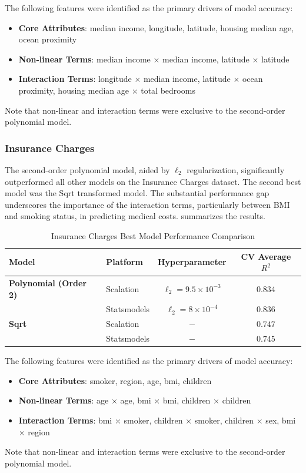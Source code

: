 \documentclass{article}
\begin{document}
The following features were identified as the primary drivers of model accuracy:
\begin{itemize}
	\item \textbf{Core Attributes}: median income, longitude, latitude, housing median age, ocean proximity
	\item \textbf{Non-linear Terms}: median income $\times$ median income, latitude $\times$ latitude
	\item \textbf{Interaction Terms}: longitude $\times$ median income, latitude $\times$ ocean proximity, housing median age $\times$ total bedrooms
\end{itemize}
Note that non-linear and interaction terms were exclusive to the second-order polynomial model.

\subsubsection{Insurance Charges}

The second-order polynomial model, aided by $\ell_2$ regularization, significantly outperformed all other models on the Insurance Charges dataset. The second best model was the Sqrt transformed model. The substantial performance gap underscores the importance of the interaction terms, particularly between BMI and smoking status, in predicting medical costs.  summarizes the results.

\begin{table}[H]
\centering
\caption{Insurance Charges Best Model Performance Comparison}
\label{tab:Insurance Charges Best Model Performance Comparison}
\begin{tabular}{@{}llcc@{}}
\toprule
\textbf{Model} & \textbf{Platform} & \textbf{Hyperparameter} & \textbf{CV Average $R^2$} \\ \midrule
\textbf{Polynomial (Order 2)} & Scalation   & $\ell_2 = 9.5\times10^{-3}$ & $0.834$ \\
                              & Statsmodels & $\ell_2 = 8 \times 10^{-4}$ & $0.836$ \\ \addlinespace
\textbf{Sqrt}              & Scalation   & $-$              & $0.747$ \\
                              & Statsmodels & $-$              & $0.745$ \\ \bottomrule
\end{tabular}
\end{table}

The following features were identified as the primary drivers of model accuracy:
\begin{itemize}
	\item \textbf{Core Attributes}: smoker, region, age, bmi, children
	\item \textbf{Non-linear Terms}: age $\times$ age, bmi $\times$ bmi, children $\times$ children
	\item \textbf{Interaction Terms}: bmi $\times$ smoker, children $\times$ smoker, children $\times$ sex, bmi $\times$ region
\end{itemize}
Note that non-linear and interaction terms were exclusive to the second-order polynomial model.
\end{document}
